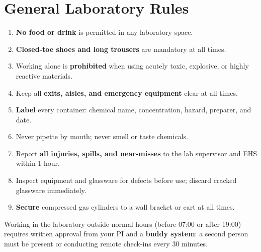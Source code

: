 \section{General Laboratory Rules}

\begin{enumerate}[noitemsep, topsep=2pt, leftmargin=1.6em, label=\textcolor{accent}{\bfseries\arabic*.}]
  \item \textbf{No food or drink} is permitted in any laboratory space.
  \item \textbf{Closed-toe shoes and long trousers} are mandatory at all times.
  \item Working alone is \textbf{prohibited} when using acutely toxic, explosive, or highly reactive materials.
  \item Keep all \textbf{exits, aisles, and emergency equipment} clear at all times.
  \item \textbf{Label} every container: chemical name, concentration, hazard, preparer, and date.
  \item Never pipette by mouth; never smell or taste chemicals.
  \item Report \textbf{all injuries, spills, and near-misses} to the lab supervisor and EHS within 1 hour.
  \item Inspect equipment and glassware for defects before use; discard cracked glassware immediately.
  \item \textbf{Secure} compressed gas cylinders to a wall bracket or cart at all times.
\end{enumerate}

\begin{warnbox}
  Working in the laboratory outside normal hours (before 07:00 or after 19:00) requires written
  approval from your PI and a \textbf{buddy system}: a second person must be present or conducting
  remote check-ins every 30 minutes.
\end{warnbox}

